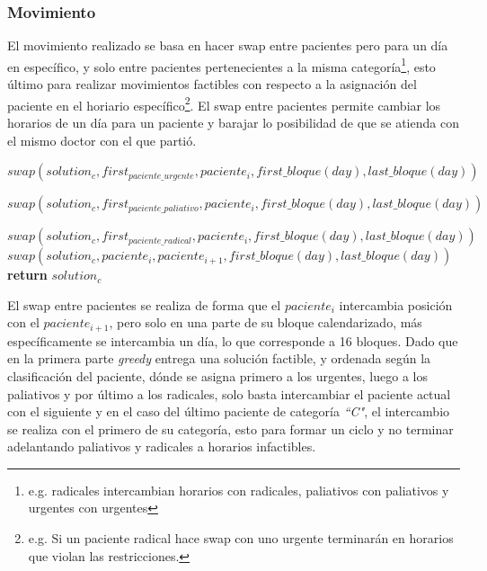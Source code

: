 \documentclass[letter, 10pt]{article}
\begin{document}
\subsubsection{Movimiento}
El movimiento realizado se basa en hacer swap entre pacientes pero para un día en específico, y solo entre pacientes pertenecientes a la misma categoría\footnote{e.g. radicales intercambian horarios con radicales, paliativos con paliativos y urgentes con urgentes}, esto último para realizar movimientos factibles con respecto a la asignación del paciente en el horiario específico\footnote{e.g. Si un paciente radical hace swap con uno urgente terminarán en horarios que violan las restricciones.}. El swap entre pacientes permite cambiar los horarios de un día para un paciente y barajar lo posibilidad de que se atienda con el mismo doctor con el que partió.

\begin{algorithm}[H]
  \caption{$ Movimiento$}\label{Mov}
  \begin{algorithmic}[1]
    
            \State $swap(solution_{c}, first_{paciente\_urgente}, paciente_{i}, first\_bloque(day), last\_bloque(day))$
    
            \State $swap(solution_{c}, first_{paciente\_paliativo}, paciente_{i}, first\_bloque(day), last\_bloque(day))$
    
            \State $swap(solution_{c}, first_{paciente\_radical}, paciente_{i}, first\_bloque(day), last\_bloque(day))$
    \Else
            \State $swap(solution_{c}, paciente_{i}, paciente_{i+1}, first\_bloque(day), last\_bloque(day))$
    \EndIf
    \State\textbf{return} \texttt{$solution_{c}$}
    \EndProcedure
  \end{algorithmic}
\end{algorithm}

El swap entre pacientes se realiza de forma que el $paciente_{i}$ intercambia posición con el $paciente_{i+1}$, pero solo en una parte de su bloque calendarizado, más específicamente se intercambia un día, lo que corresponde a 16 bloques. Dado que en la primera parte \textit{greedy} entrega una solución factible, y ordenada según la clasificación del paciente, dónde se asigna primero a los urgentes, luego a los paliativos y por último a los radicales, solo basta intercambiar el paciente actual con el siguiente y en el caso del último paciente de categoría \textit{``C"}, el intercambio se realiza con el primero de su categoría, esto para formar un ciclo y no terminar adelantando paliativos y radicales a horarios infactibles.
\end{document}
